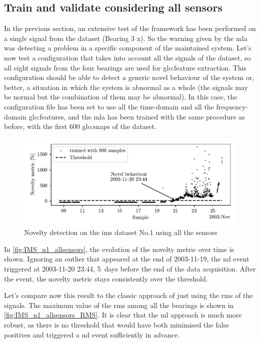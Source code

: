 \subsection{Train and validate considering all sensors}
In the previous section, an extensive test of the framework has been performed on a single signal from the dataset (Bearing 3 x). So the warning given by the \gls{mla} was detecting a problem in a specific component of the maintained system. Let's now test a configuration that takes into account all the signals of the dataset, so all eight signals from the four bearings are used for \gls{glo:feature} extraction. This configuration should be able to detect a generic novel behaviour of the system or, better, a situation in which the system is abnormal as a whole (the signals may be normal but the combination of them may be abnormal).  In this case, the configuration file has been set to use all the time-domain and all the frequency-domain \gls{glo:feature}s, and the \gls{mla} has been trained with the same procedure as before, with the first 600 \gls{glo:snap}s of the dataset. 


\begin{figure}
    \centering
    \includegraphics{images/IMS/Novelty_01_500samples_allsensors.pdf}
    \caption{Novelty detection on the \gls{ims} dataset No.1 using all the sensors}
    \label{fig:IMS_n1_allsensors}
\end{figure}

In \autoref{fig:IMS_n1_allsensors}, the evolution of the novelty metric over time is shown. Ignoring an outlier that appeared at the end of 2003-11-19, the \gls{nd} event triggered at 2003-11-20 23:44, 5~days before the end of the data acquisition. After the event, the novelty metric stays consistently over the threshold.

Let's compare now this result to the classic approach of just using the \gls{rms} of the signals. The maximum value of the \gls{rms} among all the bearings is shown in \autoref{fig:IMS_n1_allsensors_RMS}. It is clear that the \gls{ml} approach is much more robust, as there is no threshold that would have both minimised the false positives and triggered a \gls{nd} event sufficiently in advance.

